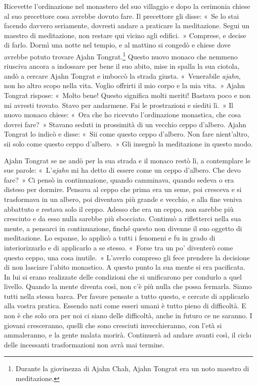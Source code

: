 Ricevette l'ordinazione nel monastero del suo villaggio e dopo la
cerimonia chiese al suo precettore cosa avrebbe dovuto fare. Il
precettore gli disse: «~Se lo stai facendo davvero seriamente, dovresti
andare a praticare la meditazione. Segui un maestro di meditazione, non
restare qui vicino agli edifici.~» Comprese, e decise di farlo. Dormì
una notte nel tempio, e al mattino si congedò e chiese dove avrebbe
potuto trovare Ajahn Tongrat.\footnote{Durante la giovinezza di Ajahn
  Chah, Ajahn Tongrat era un noto maestro di meditazione.} Questo nuovo
monaco che nemmeno riusciva ancora a indossare per bene il suo abito,
mise in spalla la sua ciotola, andò a cercare Ajahn Tongrat e imboccò la
strada giusta. «~Venerabile \emph{ajahn}, non ho altro scopo nella vita.
Voglio offrirti il mio corpo e la mia vita.~» Ajahn Tongrat rispose:
«~Molto bene! Questo significa molti meriti! Bastava poco e non mi
avresti trovato. Stavo per andarmene. Fai le prostrazioni e siediti
lì.~» Il nuovo monaco chiese: «~Ora che ho ricevuto l'ordinazione
monastica, che cosa dovrei fare?~» Stavano seduti in prossimità di un
vecchio ceppo d'albero. Ajahn Tongrat lo indicò e disse: «~Sii come
questo ceppo d'albero. Non fare nient'altro, sii solo come questo ceppo
d'albero.~» Gli insegnò la meditazione in questo modo.

Ajahn Tongrat se ne andò per la sua strada e il monaco restò lì, a
contemplare le sue parole: «~L'\emph{ajahn} mi ha detto di essere come
un ceppo d'albero. Che devo fare?~» Ci pensò in continuazione, quando
camminava, quando sedeva o era disteso per dormire. Pensava al ceppo che
prima era un seme, poi cresceva e si trasformava in un albero, poi
diventava più grande e vecchio, e alla fine veniva abbattuto e restava
solo il ceppo. Adesso che era un ceppo, non sarebbe più cresciuto e da
esso nulla sarebbe più sbocciato. Continuò a rifletterci nella sua
mente, a pensarci in continuazione, finché questo non divenne il suo
oggetto di meditazione. Lo espanse, lo applicò a tutti i fenomeni e fu
in grado di interiorizzarlo e di applicarlo a se stesso. «~Forse tra un
po' diventerò come questo ceppo, una cosa inutile.~» L'averlo compreso
gli fece prendere la decisione di non lasciare l'abito monastico. A
questo punto la sua mente si era pacificata. In lui si erano realizzate
delle condizioni che si unificarono per condurlo a quel livello. Quando
la mente diventa così, non c'è più nulla che possa fermarla. Siamo tutti
nella stessa barca. Per favore pensate a tutto questo, e cercate di
applicarlo alla vostra pratica. Essendo nati come esseri umani è tutto
pieno di difficoltà. E non è che solo ora per noi ci siano delle
difficoltà, anche in futuro ce ne saranno. I giovani cresceranno, quelli
che sono cresciuti invecchieranno, con l'età si ammaleranno, e la gente
malata morirà. Continuerà ad andare avanti così, il ciclo delle
incessanti trasformazioni non avrà mai termine.

